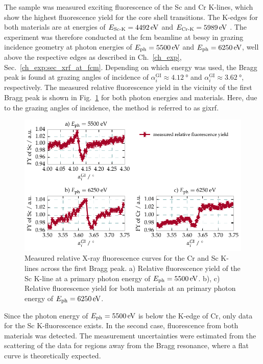 The sample was measured exciting fluorescence of the Sc and Cr K-lines, which show the highest fluorescence yield for the core shell transitions. The K-edges for both materials are at energies of $E_\text{Sc-K} = \ev{4492}$ and $E_\text{Cr-K} = \ev{5989}$ \cite{elam_new_2002}. The experiment was therefore conducted at the \gls{fcm} beamline at \gls{bessy} in grazing incidence geometry at photon energies of $E_\text{ph} = \ev{5500}$ and $E_\text{ph} = \ev{6250}$, well above the respective edges as described in Ch.~\ref{ch_exp}, Sec.~\ref{ch_exp:sec_xrf_at_fcm}. Depending on which energy was used, the Bragg peak is found at grazing angles of incidence of $\alpha_i^\text{GI} \approx \SI{4.12}{\degree}$ and $\alpha_i^\text{GI} \approx \SI{3.62}{\degree}$, respectively. The measured relative fluorescence yield in the vicinity of the first Bragg peak is shown in Fig.~\ref{ch_spec:fig_CrSc_fluorescence_data} for both photon energies and materials. Here, due to the grazing angles of incidence, the method is referred to as \gls{gixrf}.
\begin{figure}[htbp]
  \centering
  \includegraphics[width=\textwidth]{img/CrSc_fluorescence_data}
  \caption{Measured relative X-ray fluorescence curves for the Cr and Sc K-lines across the first Bragg peak. a) Relative fluorescence yield of the Sc K-line at a primary photon energy of $E_\text{ph}=\ev{5500}$. b), c) Relative fluorescence yield for both materials at an primary photon energy of $E_\text{ph} = \ev{6250}$.}
  \label{ch_spec:fig_CrSc_fluorescence_data}
\end{figure}
Since the photon energy of $E_\text{ph} = \ev{5500}$ is below the K-edge of Cr, only data for the Sc K-fluorescence exists. In the second case, fluorescence from both materials was detected. The measurement uncertainties were estimated from the scattering of the data for regions away from the Bragg resonance, where a flat curve is theoretically expected.

